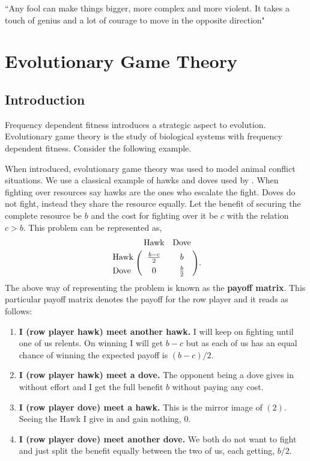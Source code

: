 \documentclass[oneside,11pt,a4paper]{book}
\begin{document}
\begin{savequote}[14pc]
\sffamily
``Any fool can make things bigger, more complex and more violent.
 It takes a touch of genius and a lot of courage to move in the opposite direction"
\end{savequote}

\chapter{Evolutionary Game Theory}
\label{chap:egttheory}

\graphicspath{{EGTfigs/}{EGTfigs/}{EGTfigs/}}

\section{Introduction}

Frequency dependent fitness introduces a strategic aspect to evolution.
Evolutionary game theory is the study of biological systems with frequency dependent fitness.
Consider the following example.

When introduced, evolutionary game theory was used to model animal conflict situations.
We use a classical example of hawks and doves used by \citet{maynard-smith:1973to}.
When fighting over resources say hawks are the ones who escalate the fight.
Doves do not fight, instead they share the resource equally.
Let the benefit of securing the complete resource be $b$ and the cost for fighting over it be $c$ with the relation $c>b$.
This problem can be represented as,
%
\begin{eqnarray}
\bordermatrix{
&\text{Hawk}&\text{Dove}\cr
\text{Hawk}&\frac{b-c}{2} & b\cr
\text{Dove}& 0 & \frac{b}{2}
}.
\end{eqnarray}
%
The above way of representing the problem is known as the \textbf{payoff matrix}.
This particular payoff matrix denotes the payoff for the row player and it reads as follows:
\begin{enumerate}[(1)]
\item \textbf{I (row player hawk) meet another hawk.}
I will keep on fighting until one of us relents.
On winning I will get $b-c$ but as each of us has an equal chance of winning the expected payoff is $(b-c)/2$.
\item \textbf{I (row player hawk) meet a dove.} The opponent being a dove gives in without effort and I get the full benefit $b$ without paying any cost.
\item \textbf{I (row player dove) meet a hawk.} This is the mirror image of $(2)$.
Seeing the Hawk I give in and gain nothing, $0$.
\item \textbf{I (row player dove) meet another dove.} We both do not want to fight and just split the benefit equally between the two of us, each getting, $b/2$.
\end{enumerate}
\end{document}
